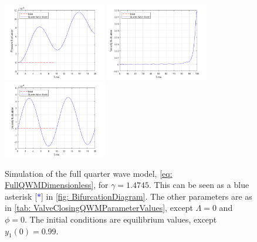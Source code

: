 \begin{figure}[!ht]
    \includegraphics[width=0.4\textwidth]{Figures/QWMSimulation/NearEquilibriumOscillations/B-Short.png}
    \includegraphics[width=0.4\textwidth]{Figures/QWMSimulation/NearEquilibriumOscillations/C.png}
    \includegraphics[width=0.4\textwidth]{Figures/QWMSimulation/NearEquilibriumOscillations/C-Short.png}
    \caption{Simulation of the full quarter wave model, \cref{eq: FullQWMDimensionless}, for $\gamma = 1.4745$. This can be seen as a blue asterisk [\textcolor{Blue}{$*$}] in \cref{fig: BifurcationDiagram}. The other parameters are as in \cref{tab: ValveClosingQWMParameterValues}, except $\Lambda=0$ and $\phi=0$. The initial conditions are equilibrium values, except $y_1(0) = 0.99$.}
    \label{fig: QWNearEquil}
\end{figure}